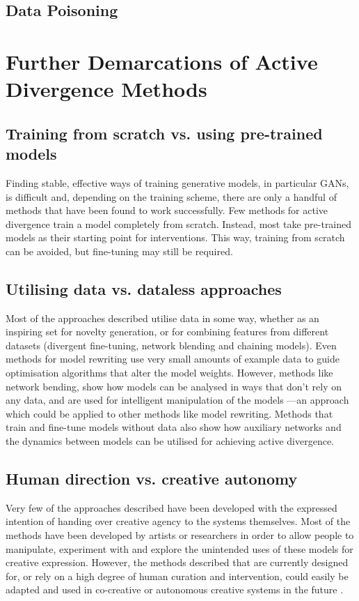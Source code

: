 \subsection{Data Poisoning}

\section{Further Demarcations of Active Divergence Methods}

\subsection{Training from scratch vs. using pre-trained models}

Finding stable, effective ways of training generative models, in particular GANs, is difficult and, depending on the training scheme, there are only a handful of methods that have been found to work successfully. Few methods for active divergence train a model completely from scratch. Instead, most take pre-trained models as their starting point for interventions. This way, training from scratch can be avoided, but fine-tuning may still be required. 


\subsection{Utilising data vs. dataless approaches}
Most of the approaches described utilise data in some way, whether as an inspiring set for novelty generation, or for combining features from different datasets (divergent fine-tuning, network blending and chaining models). Even methods for model rewriting use very small amounts of example data to guide optimisation algorithms that alter the model weights. However, methods like network bending, show how models can be analysed in ways that don't rely on any data, and are used for intelligent manipulation of the models ---an approach which could be applied to other methods like model rewriting. Methods that train and fine-tune models without data also show how auxiliary networks and the dynamics between models can be utilised for achieving active divergence.

\subsection{Human direction vs. creative autonomy}
Very few of the approaches described have been developed with the expressed intention of handing over creative agency to the systems themselves. Most of the methods have been developed by artists or researchers in order to allow people to manipulate, experiment with and explore the unintended uses of these models for creative expression. However, the methods described that are currently designed for, or rely on a high degree of human curation and intervention, could easily be adapted and used in co-creative or autonomous creative systems in the future \citep{berns2021automating}.

